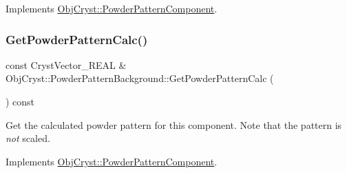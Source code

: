 Implements \mbox{\hyperlink{class_obj_cryst_1_1_powder_pattern_component_a727488f859528b0a9b5da47973804e01}{Obj\+Cryst\+::\+Powder\+Pattern\+Component}}.

\mbox{\label{class_obj_cryst_1_1_powder_pattern_background_aeff3379aae4bd4ff3d6ff353ce8f7f96}} 
\subsubsection{\texorpdfstring{GetPowderPatternCalc()}{GetPowderPatternCalc()}}
{\footnotesize\ttfamily const Cryst\+Vector\+\_\+\+R\+E\+AL \& Obj\+Cryst\+::\+Powder\+Pattern\+Background\+::\+Get\+Powder\+Pattern\+Calc (\begin{DoxyParamCaption}{ }\end{DoxyParamCaption}) const\hspace{0.3cm}{\ttfamily [virtual]}}

Get the calculated powder pattern for this component. Note that the pattern is {\itshape not} scaled. 

Implements \mbox{\hyperlink{class_obj_cryst_1_1_powder_pattern_component_a45258e9f9b44ff019bf53aa3dfb1a305}{Obj\+Cryst\+::\+Powder\+Pattern\+Component}}.

